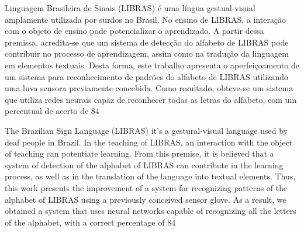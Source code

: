 \documentclass[capchap,capsec,sumarioincompleto,a4paper,12pt,plainheader,normaltoc]{utfprtex}%
\begin{document}
\begin{Resumo}

\hspace*{-1.53cm}Linguagem Brasileira de Sinais (LIBRAS) é uma língua gestual-visual amplamente utilizada por surdos no Brasil. No ensino de LIBRAS, a interação com o objeto de ensino pode potencializar o aprendizado. A partir dessa premissa, acredita-se que um sistema de detecção do alfabeto de LIBRAS pode contribuir no processo de aprendizagem, assim como na tradução da linguagem em elementos textuais. Desta forma, este trabalho apresenta o 
aperfeiçoamento de um sistema para reconhecimento de padrões do alfabeto de LIBRAS utilizando uma luva sensora previamente concebida. Como resultado, obteve-se um sistema que utiliza redes neurais capaz de reconhecer todas as letras do alfabeto, com um percentual de acerto de 84%
\end{Resumo}

\begin{Abstract}


\hspace*{-1.53cm}The Brazilian Sign Language (LIBRAS) it's a gestural-visual language used by deaf people in Brazil. In the teaching of LIBRAS, an interaction with the object of teaching can potentiate learning. From this premise, it is believed that a system of detection of the alphabet of LIBRAS can contribute in the learning process, as well as in the translation of the language into textual elements. Thus, this work presents the improvement of a system for recognizing patterns of the alphabet of LIBRAS using a previously conceived sensor glove. As a result, we obtained a system that uses neural networks capable of recognizing all the letters of the alphabet, with a correct percentage of 84%
\end{Abstract}
\end{document}
